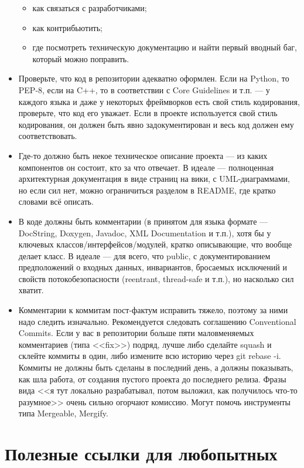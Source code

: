 \documentclass[a5paper]{article}
\begin{document}
\begin{itemize}
\begin{itemize}
        \item как связаться с разработчиками;
        \item как контрибьютить;
        \item где посмотреть техническую документацию и найти первый вводный баг, который можно поправить.
    \end{itemize}
    \item Проверьте, что код в репозитории адекватно оформлен. Если на Python, то PEP-8, если на C++, то в соответствии с Core Guidelines и т.п. --- у каждого языка и даже у некоторых фреймворков есть свой стиль кодирования, проверьте, что код его уважает. Если в проекте используется свой стиль кодирования, он должен быть явно задокументирован и весь код должен ему соответствовать.
    \item Где-то должно быть некое техническое описание проекта --- из каких компонентов он состоит, кто за что отвечает. В идеале --- полноценная архитектурная документация в виде страниц на вики, с UML-диаграммами, но если сил нет, можно ограничиться разделом в README, где кратко словами всё описать.
    \item В коде должны быть комментарии (в принятом для языка формате --- DocString, Doxygen, Javadoc, XML Documentation и т.п.), хотя бы у ключевых классов/интерфейсов/модулей, кратко описывающие, что вообще делает класс. В идеале --- для всего, что public, с документированием предположений о входных данных, инвариантов, бросаемых исключений и свойств потокобезопасности (reentrant, thread-safe и т.п.), но насколько сил хватит.
    \item Комментарии к коммитам пост-фактум исправить тяжело, поэтому за ними надо следить изначально. Рекомендуется следовать соглашению Conventional Commits. Если у вас в репозитории больше пяти маловменяемых комментариев (типа <<fix>>) подряд, лучше либо сделайте squash и склейте коммиты в один, либо измените всю историю через git rebase -i. Коммиты не должны быть сделаны в последний день, а должны показывать, как шла работа, от создания пустого проекта до последнего релиза. Фразы вида <<я тут локально разрабатывал, потом выложил, как получилось что-то разумное>> очень сильно огорчают комиссию. Могут помочь инструменты типа Mergeable, Mergify.
\end{itemize}

\section*{Полезные ссылки для любопытных}
\end{document}
